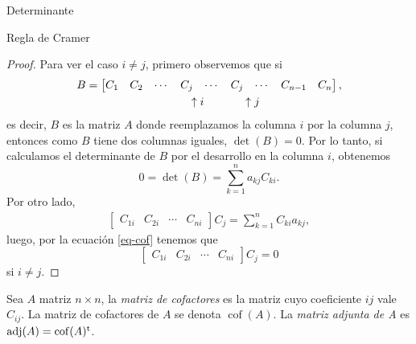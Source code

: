 \begin{chapter}{Determinante}
\begin{section}{Regla de Cramer}
\begin{proof}
      Para ver el caso $i \ne j$, primero observemos que si
      \begin{align*}
          B & = \begin{bmatrix} C_1 & C_2&\cdots &C_j& \cdots &C_j & \cdots &C_{n-1}& C_{n}\end{bmatrix}, \\
            & \hspace{3.2cm} \uparrow i \hspace{1.2cm} \uparrow j
      \end{align*}
      es decir, $B$ es la matriz $A$ donde reemplazamos la columna $i$ por la columna $j$, entonces como $B$ tiene dos columnas iguales, $\det(B) =0$. Por lo tanto, si calculamos el determinante de $B$ por el desarrollo en la columna $i$, obtenemos
      \begin{equation} \label{eq-cof}
          0 = \det(B) = \sum_{k=1}^{n} a_{kj}C_{ki}.
      \end{equation}
      Por otro lado,
      \begin{align*}
          \begin{bmatrix} C_{1i} & C_{2i} & \cdots & C_{ni}\end{bmatrix} C_j = \sum_{k=1}^{n} C_{ki}a_{kj},
      \end{align*}
      luego, por la ecuación \eqref{eq-cof} tenemos que
      $$
          \begin{bmatrix} C_{1i} & C_{2i} & \cdots & C_{ni}\end{bmatrix} C_j =0
      $$
      si $i \ne j$.

  \end{proof}

  \begin{definicion} Sea $A$ matriz $n \times n$, la \textit{matriz de cofactores} es la matriz cuyo coeficiente $ij$ vale $C_{ij}$. La matriz de cofactores de $A$  se denota $\operatorname{cof}(A)$. La \textit{matriz adjunta de A} es $\operatorname{adj}(A) = \operatorname{cof}(A)^{\operatorname{t}}$.
  \end{definicion}


\end{section}
\end{chapter}
